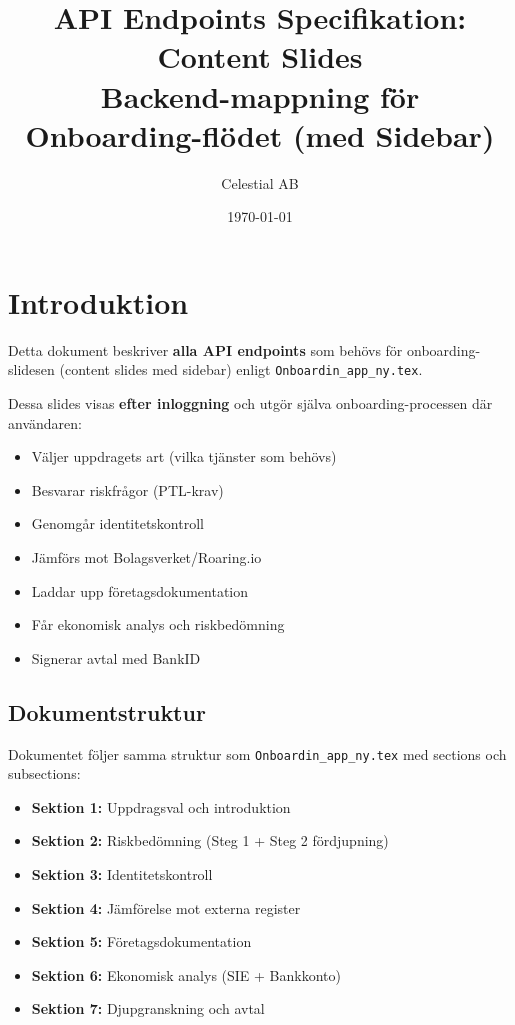 \documentclass[12pt,a4paper]{article}
\title{\textbf{API Endpoints Specifikation: Content Slides} \\ \large Backend-mappning för Onboarding-flödet (med Sidebar)}
\author{Celestial AB}
\date{\today}
\begin{document}
\maketitle
\tableofcontents
\newpage

\section{Introduktion}

Detta dokument beskriver \textbf{alla API endpoints} som behövs för onboarding-slidesen (content slides med sidebar) enligt \texttt{Onboardin\_app\_ny.tex}.

Dessa slides visas \textbf{efter inloggning} och utgör själva onboarding-processen där användaren:
\begin{itemize}[noitemsep]
  \item Väljer uppdragets art (vilka tjänster som behövs)
  \item Besvarar riskfrågor (PTL-krav)
  \item Genomgår identitetskontroll
  \item Jämförs mot Bolagsverket/Roaring.io
  \item Laddar upp företagsdokumentation
  \item Får ekonomisk analys och riskbedömning
  \item Signerar avtal med BankID
\end{itemize}

\subsection{Dokumentstruktur}

Dokumentet följer samma struktur som \texttt{Onboardin\_app\_ny.tex} med sections och subsections:

\begin{itemize}[noitemsep]
  \item \textbf{Sektion 1:} Uppdragsval och introduktion
  \item \textbf{Sektion 2:} Riskbedömning (Steg 1 + Steg 2 fördjupning)
  \item \textbf{Sektion 3:} Identitetskontroll
  \item \textbf{Sektion 4:} Jämförelse mot externa register
  \item \textbf{Sektion 5:} Företagsdokumentation
  \item \textbf{Sektion 6:} Ekonomisk analys (SIE + Bankkonto)
  \item \textbf{Sektion 7:} Djupgranskning och avtal
\end{itemize}
\end{document}
